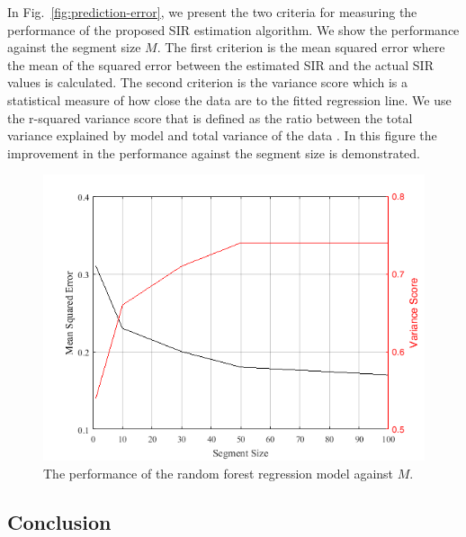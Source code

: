 In Fig.~\ref{fig:prediction-error}, we present the two criteria for measuring the performance of the proposed SIR estimation algorithm. We show the performance against the segment size $M$. The first criterion is the mean squared error where the mean of the squared error between the estimated SIR and the actual SIR values is calculated. The second criterion is the variance score which is a statistical measure of how close the data are to the fitted regression line. We use the r-squared variance score that is defined as the ratio between the total variance explained by model and total variance of the data \cite{r-squared}. In this figure the improvement in the performance against the segment size is demonstrated. 

\begin{figure}[tbp]
 \centering
 \includegraphics[width=0.75\columnwidth]{./chapter-ftml/plots/prediction-error}
 \caption{The performance of the random forest regression model against $M$.}
 \label{ftml-conf:fig:prediction-error}
\end{figure}

\subsection{Conclusion}\label{ftml-conf:sec:conclusion}

